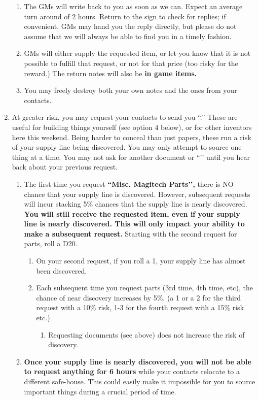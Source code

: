 \documentclass[green]{GL2020}
\begin{document}
\begin{enumerate}
\begin{enumerate}
    \item The GMs will write back to you as soon as we can. Expect an average turn around of 2 hours. Return to the sign to check for replies; if convenient, GMs may hand you the reply directly, but please do not assume that we will always be able to find you in a timely fashion.
    \item GMs will either supply the requested item, or let you know that it is not possible to fulfill that request, or not for that price (too risky for the reward.) The return notes will also be \textbf{in game items.}
    \item You may freely destroy both your own notes and the ones from your contacts.
  \end{enumerate}
  \item At greater risk, you may request your contacts to send you ``\iMagitechParts{}.’’ These are useful for building things yourself (see option 4 below), or for other inventors here this weekend. Being harder to conceal than just papers, these run a risk of your supply line being discovered. You may only attempt to source one thing at a time. You may not ask for another document or ``\iMagitechParts{}’’ until you hear back about your previous request.
  \begin{enumerate}
    \item The first time you request \textbf{``Misc. Magitech Parts’’,} there is NO chance that your supply line is discovered. However, subsequent requests will incur stacking 5\% chances that the supply line is nearly discovered.  \textbf{You will still receive the requested item, even if your supply line is nearly discovered. This will only impact your ability to make a subsequent request.} Starting with the second request for parts, roll a D20.
\begin{enumerate}
    \item On your second request, if you roll a 1, your supply line has almost been discovered.
    \item Each subsequent time you request parts (3rd time, 4th time, etc), the chance of near discovery increases by 5\%. (a 1 or a 2 for the third request with a 10\% risk, 1-3 for the fourth request with a 15\% risk etc.)
    \begin{enumerate}
       \item Requesting documents (see above) does not increase the risk of discovery.
    \end{enumerate}
\end{enumerate}
    \item \textbf{Once your supply line is nearly discovered, you will not be able to request anything for 6 hours} while your contacts relocate to a different safe-house. This could easily make it impossible for you to source important things during a crucial period of time. 

\end{enumerate}
\end{enumerate}
\end{document}
